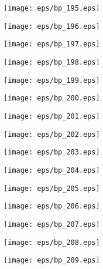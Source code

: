\documentclass{book}
\begin{document}
	\clearpage\begin{figure}[p]
    \centering
	\texttt{[image: eps/bp\_195.eps]}
	\end{figure}
	\clearpage\begin{figure}[p]
    \centering
	\texttt{[image: eps/bp\_196.eps]}
	\end{figure}
	\clearpage\begin{figure}[p]
    \centering
	\texttt{[image: eps/bp\_197.eps]}
	\end{figure}
	\clearpage\begin{figure}[p]
    \centering
	\texttt{[image: eps/bp\_198.eps]}
	\end{figure}
	\clearpage\begin{figure}[p]
    \centering
	\texttt{[image: eps/bp\_199.eps]}
	\end{figure}
	\clearpage\begin{figure}[p]
    \centering
	\texttt{[image: eps/bp\_200.eps]}
	\end{figure}
	\clearpage\begin{figure}[p]
    \centering
	\texttt{[image: eps/bp\_201.eps]}
	\end{figure}
	\clearpage\begin{figure}[p]
    \centering
	\texttt{[image: eps/bp\_202.eps]}
	\end{figure}
	\clearpage\begin{figure}[p]
    \centering
	\texttt{[image: eps/bp\_203.eps]}
	\end{figure}
	\clearpage\begin{figure}[p]
    \centering
	\texttt{[image: eps/bp\_204.eps]}
	\end{figure}
	\clearpage\begin{figure}[p]
    \centering
	\texttt{[image: eps/bp\_205.eps]}
	\end{figure}
	\clearpage\begin{figure}[p]
    \centering
	\texttt{[image: eps/bp\_206.eps]}
	\end{figure}
	\clearpage\begin{figure}[p]
    \centering
	\texttt{[image: eps/bp\_207.eps]}
	\end{figure}
	\clearpage\begin{figure}[p]
    \centering
	\texttt{[image: eps/bp\_208.eps]}
	\end{figure}
	\clearpage\begin{figure}[p]
    \centering
	\texttt{[image: eps/bp\_209.eps]}
	\end{figure}
\end{document}
